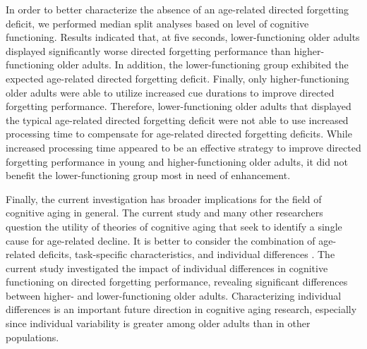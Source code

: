 \documentclass[man]{apa6}
\begin{document}
In order to better characterize the absence of an age-related directed forgetting deficit, we performed median split analyses based on level of cognitive functioning. Results indicated that, at five seconds, lower-functioning older adults displayed significantly worse directed forgetting performance than higher-functioning older adults. In addition, the lower-functioning group exhibited the expected age-related directed forgetting deficit. Finally, only higher-functioning older adults were able to utilize increased cue durations to improve directed forgetting performance. Therefore, lower-functioning older adults that displayed the typical age-related directed forgetting deficit were not able to use increased processing time to compensate for age-related directed forgetting deficits. While increased processing time appeared to be an effective strategy to improve directed forgetting performance in young and higher-functioning older adults, it did not benefit the lower-functioning group most in need of enhancement.

Finally, the current investigation has broader implications for the field of cognitive aging in general. The current study and many other researchers question the utility of theories of cognitive aging that seek to identify a single cause for age-related decline. It is better to consider the combination of age-related deficits, task-specific characteristics, and individual differences \parencite{albinet.et.al2012}. The current study investigated the impact of individual differences in cognitive functioning on directed forgetting performance, revealing significant differences between higher- and lower-functioning older adults. Characterizing individual differences is an important future direction in cognitive aging research, especially since individual variability is greater among older adults than in other populations.

\printbibliography

\end{document}

